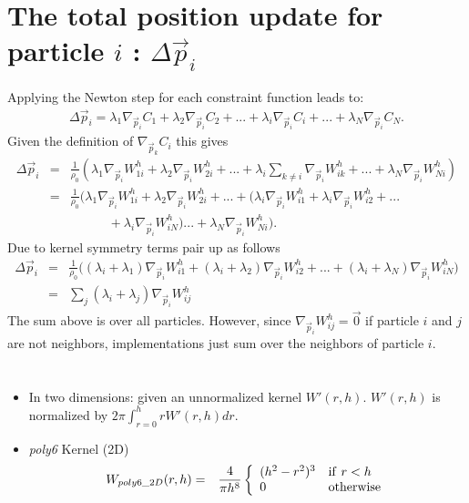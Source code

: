 \documentclass[8pt]{article}
\begin{document}
\section*{\sf The total position update for particle $i$ : $\Delta \vec{p}_i$}
Applying the Newton step for each constraint function leads to:
\begin{eqnarray}
  \Delta \vec{p}_i = \lambda_1\nabla_{\vec{p}_i}C_1 + \lambda_2\nabla_{\vec{p}_i}C_2 + ... +\lambda_i\nabla_{\vec{p}_i}C_i + ... +\lambda_N\nabla_{\vec{p}_i}C_N.
\end{eqnarray}
Given the definition of $\nabla_{\vec{p}_k}C_i$ this gives
\begin{eqnarray*}
  \Delta \vec{p}_i &=& \frac{1}{\rho_0}\left(\lambda_1\nabla_{\vec{p}_i}W^h_{1i} + \lambda_2\nabla_{\vec{p}_i}W^h_{2i} + ... + \lambda_i\sum_{k\neq i}\nabla_{\vec{p}_i}W^h_{ik} + ... + \lambda_N\nabla_{\vec{p}_i}W^h_{Ni}\right)\\
  &=& \frac{1}{\rho_0}{\Big(}\lambda_1\nabla_{\vec{p}_i}W^h_{1i} + \lambda_2\nabla_{\vec{p}_i}W^h_{2i} + ... + (\lambda_i\nabla_{\vec{p}_i}W^h_{i1} + \lambda_i\nabla_{\vec{p}_i}W^h_{i2} +  ... \\
  && \quad \quad \quad + \lambda_i\nabla_{\vec{p}_i}W^h_{iN} )... + \lambda_N\nabla_{\vec{p}_i}W^h_{Ni}{\Big).}
\end{eqnarray*}
Due to kernel symmetry terms pair up as follows
\begin{eqnarray*}
   \Delta \vec{p}_i &=& \frac{1}{\rho_0}\Big((\lambda_i + \lambda_1)\nabla_{\vec{p}_i}W^h_{i1} + (\lambda_i + \lambda_2)\nabla_{\vec{p}_i}W^h_{i2} + ... + (\lambda_i + \lambda_N)\nabla_{\vec{p}_i}W^h_{iN}\Big)\\
           &=& \sum_j(\lambda_i + \lambda_j)\nabla_{\vec{p}_i}W^h_{ij}
\end{eqnarray*}
The sum above is over all particles. However, since $\nabla_{\vec{p}_i}W^h_{ij} = \vec{0}$ if particle $i$ and $j$ are not neighbors, implementations just sum over the neighbors of particle $i$. 


\section*{}
\begin{itemize}
    \item In two dimensions: given an unnormalized kernel $W'(r, h)$. $W'(r, h)$ is normalized by $2\pi\int_{r=0}^h r W'(r, h) dr$.
    \item \emph{poly6} Kernel (2D)
        \begin{eqnarray}
        W_{poly6\_2D}(r, h) &=& \frac{4}{\pi h^8}\left\{\begin{array}{ll} (h^2 - r^2)^3 & {\rm if\ } r < h \\ 0 & {\rm otherwise}\end{array}\right.
        \end{eqnarray}
\end{itemize}
\end{document}
